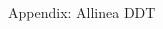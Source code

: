 \documentclass[pdf,aspectratio=169]{beamer}
\begin{document}
\begin{frame}{Appendix: Allinea DDT}
\begin{columns}[T]
\begin{column}[T]{0.45\textwidth}
\begin{figure}
      \end{figure}
    \end{column}
  \end{columns}
\end{frame}
\end{document}
